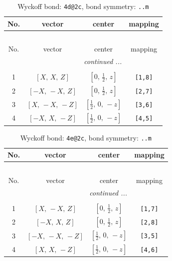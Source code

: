 \documentclass[fleqn,8pt]{jsarticle}
\begin{document}
\begin{longtable}{cccc}
\caption{Wyckoff bond: {\tt 4d@2c}, bond symmetry: {\tt ..m}}
 \\
 \hline \hline
No. & vector & center & mapping \\ \hline \endfirsthead

\multicolumn{3}{l}{\tablename\ \thetable{}} \\
 \hline \hline
No. & vector & center & mapping \\ \hline \endhead

 \hline \hline
\multicolumn{3}{r}{\footnotesize\it continued ...} \\ \endfoot

 \hline \hline
\multicolumn{3}{r}{} \\ \endlastfoot

1 & $\left[ X,\, X,\, Z \right]$ & $\left[ 0,\, \frac{1}{2},\, z \right]$ & {\tt [1,8]} \\ \hline
2 & $\left[ - X,\, - X,\, Z \right]$ & $\left[ 0,\, \frac{1}{2},\, z \right]$ & {\tt [2,7]} \\ \hline
3 & $\left[ X,\, - X,\, - Z \right]$ & $\left[ \frac{1}{2},\, 0,\, - z \right]$ & {\tt [3,6]} \\ \hline
4 & $\left[ - X,\, X,\, - Z \right]$ & $\left[ \frac{1}{2},\, 0,\, - z \right]$ & {\tt [4,5]} \\
\end{longtable}
\renewcommand{\arraystretch}{1.2}
\begin{longtable}{cccc}
\caption{Wyckoff bond: {\tt 4e@2c}, bond symmetry: {\tt ..m}}
 \\
 \hline \hline
No. & vector & center & mapping \\ \hline \endfirsthead

\multicolumn{3}{l}{\tablename\ \thetable{}} \\
 \hline \hline
No. & vector & center & mapping \\ \hline \endhead

 \hline \hline
\multicolumn{3}{r}{\footnotesize\it continued ...} \\ \endfoot

 \hline \hline
\multicolumn{3}{r}{} \\ \endlastfoot

1 & $\left[ X,\, - X,\, Z \right]$ & $\left[ 0,\, \frac{1}{2},\, z \right]$ & {\tt [1,7]} \\ \hline
2 & $\left[ - X,\, X,\, Z \right]$ & $\left[ 0,\, \frac{1}{2},\, z \right]$ & {\tt [2,8]} \\ \hline
3 & $\left[ - X,\, - X,\, - Z \right]$ & $\left[ \frac{1}{2},\, 0,\, - z \right]$ & {\tt [3,5]} \\ \hline
4 & $\left[ X,\, X,\, - Z \right]$ & $\left[ \frac{1}{2},\, 0,\, - z \right]$ & {\tt [4,6]} \\
\end{longtable}
\end{document}

